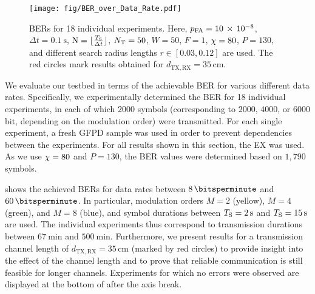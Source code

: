 \scaleSubsectionBelow
%
\begin{figure}[!tbp]
    \centering
        \vspace{-1cm}
    \texttt{[image: fig/BER\_over\_Data\_Rate.pdf]}\vspace*{-1mm}
    \caption{\acp{BER} for 18 individual experiments. Here, $p_\mathrm{FA} = 10 \, \times \, 10^{-8}$, $\Delta t = \SI{0.1}{\s} $, $\mathrm{N} = \lfloor \frac{T_{\mathrm{S}}}{\Delta t} \rfloor$, $N_\mathrm{T} = 50$, $W = 50$, $F = 1$, $\chi = 80$, $P = 130$, and different search radius lengths $r \in [0.03, 0.12]$ are used. The red circles mark results obtained for $d_{\mathrm{TX},\mathrm{RX}} = 35 \,\si{\centi\meter}$.}\vspace*{-1.1cm}
    \label{fig:ber}
\end{figure}
\vspace{1mm}
%
We evaluate our testbed in terms of the achievable \ac{BER} for various different data rates. Specifically, we experimentally determined the \ac{BER} for 18 individual experiments, in each of which $\num{2000}$ symbols (corresponding to $\num{2000}$, $\num{4000}$, or $\num{6000}$ bit, depending on the modulation order) were transmitted. For each single experiment, a fresh \ac{GFPD} sample was used in order to prevent dependencies between the experiments. For all results shown in this section, the \ac{EX} was used. As we use $\chi = 80$ and $P = 130$, the \ac{BER} values were determined based on $1,790$ symbols.

 shows the achieved \acp{BER} for data rates between $\SI{8}{\bitsperminute}$ and $\SI{60}{\bitsperminute}$. In particular, modulation orders $M = 2$ (yellow), $M = 4$ (green), and $M = 8$ (blue), and symbol durations between $\Ts = \SI{2}{\s}$ and $T_{\mathrm{S}} = \SI{15}{\text{s}}$ are used. The individual experiments thus correspond to transmission durations between $\SI{67}{\minute}$ and $\SI{500}{\minute}$. Furthermore, we present results for a transmission channel length of $d_{\mathrm{TX},\mathrm{RX}} = 35 \,\si{\centi\meter}$ (marked by red circles) to provide insight into the effect of the channel length and to prove that reliable communication is still feasible for longer channels. Experiments for which no errors were observed are displayed at the bottom of  after the axis break.
%
\scaleSubsubsection
